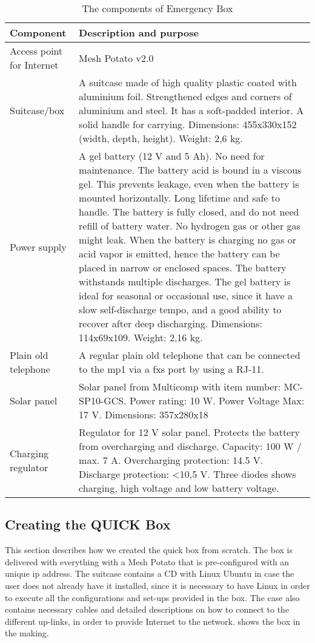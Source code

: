 \begin{center}
\begin{table}[h!]
\caption{\label{tab:components}The components of Emergency Box}
    \begin{tabular}{ | l | p{9cm} |}
    \hline
    \textbf{Component} & \textbf{Description and purpose} \\ 
    \hline
    Access point for Internet &  Mesh Potato v2.0\\ 
    \hline
    Suitcase/box &  A suitcase made of high quality plastic coated with aluminium foil. Strengthened edges and corners of aluminium and steel. It has a soft-padded interior. A solid handle for carrying. Dimensions: 455x330x152 (width, depth, height). Weight: 2,6 kg. \\ 
    \hline
    Power supply & A gel battery (12 V and 5 Ah). No need for maintenance. The battery acid is bound in a viscous gel. This prevents leakage, even when the battery is mounted horizontally. Long lifetime and safe to handle. The battery is fully closed, and do not need refill of battery water. No hydrogen gas or other gas might leak. When the battery is charging no gas or acid vapor is emitted, hence the battery can be placed in narrow or enclosed spaces. The battery withstands multiple discharges. The gel battery is ideal for seasonal or occasional use, since it have a slow self-discharge tempo, and a good ability to recover after deep discharging. Dimensions: 114x69x109. Weight: 2,16 kg. \\
    \hline
    Plain old telephone &  A regular plain old telephone that can be connected to the \gls{mp1} via a \gls{fxs} port by using a RJ-11. \\
	\hline
	Solar panel & Solar panel from Multicomp with item number: MC-SP10-GCS. Power rating: 10 W. Power Voltage Max: 17 V. Dimensions: 357x280x18\\
	\hline
	Charging regulator & Regulator for 12 V solar panel. Protects the battery from overcharging and discharge. Capacity: 100 W / max. 7 A. Overcharging protection: 14.5 V. Discharge protection: <10,5 V. Three diodes shows charging, high voltage and low battery voltage. \\
	\hline
    \end{tabular}
   \end{table}
\end{center}

\subsection{Creating the QUICK Box}
This section describes how we created the \gls{quick} box from scratch. The box is delivered with everything with a Mesh Potato that is pre-configured with an unique \gls{ip} address. The suitcase contains a CD with Linux Ubuntu in case the user does not already have it installed, since it is necessary to have Linux in order to execute all the configurations and set-ups provided in the box. The case also contains necessary cables and detailed descriptions on how to connect to the different up-links, in order to provide Internet to the network.  shows the box in the making.


